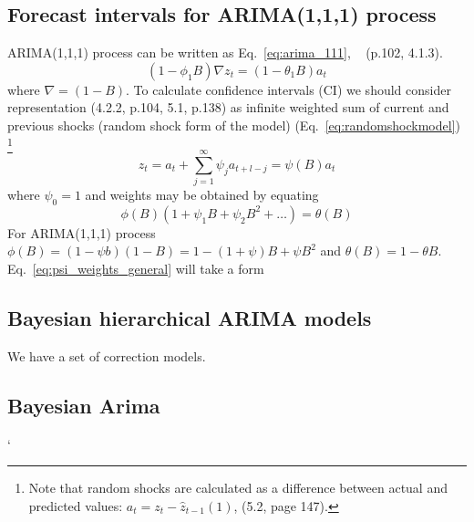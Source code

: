 \documentclass[paper=a4, fontsize=12pt]{article}
\begin{document}
\subsection{Forecast intervals for ARIMA(1,1,1) process}
ARIMA(1,1,1) process can be written as Eq.~\ref{eq:arima_111}, ~\cite{Box_Jenkins_Arima} (p.102, 4.1.3).
\begin{equation}\label{eq:arima_111}
(1 - \phi_1 B) \nabla z_t = (1 - \theta_1 B) a_t
\end{equation}
where $\nabla = (1-B)$. To calculate confidence intervals (CI) we should consider representation (4.2.2, p.104, 5.1, p.138) as infinite weighted sum of current and previous shocks (random shock form of the model) (Eq.~\ref{eq:randomshockmodel})
\footnote{Note that random shocks are calculated as a difference between actual and predicted values: $a_t = z_t - \hat z_{t-1}(1)$, (5.2, page 147).}
\begin{equation} \label{eq:randomshockmodel}
z_{t} = a_t + \sum_{j=1}^{\infty} \psi_j a_{t+l-j} = \psi(B) a_t
\end{equation}
where $\psi_0=1$ and weights may be obtained by equating
\begin{equation} \label{eq:psi_weights_general}
\phi(B)(1 + \psi_1 B + \psi_2 B^2 + \dots ) = \theta (B)
\end{equation}
For ARIMA(1,1,1) process $\phi(B) = (1-\psi b)(1-B) = 1 - (1+\psi)B + \psi B^2$ and $\theta(B) = 1 - \theta B$. Eq.~\ref{eq:psi_weights_general} will take a form

\subsection{Bayesian hierarchical ARIMA models}
We have a set of correction models.

\subsection{Bayesian Arima}
\newpage`


\end{document}
